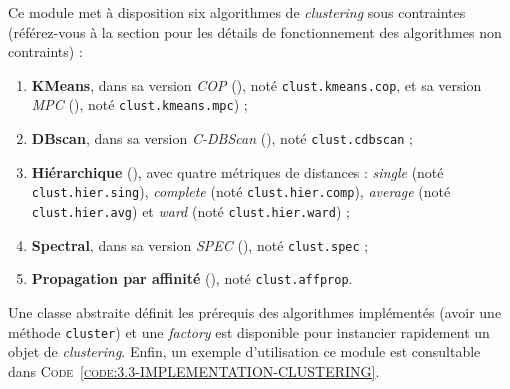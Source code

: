 		Ce module met à disposition six algorithmes de \textit{clustering} sous contraintes (référez-vous à la section  pour les détails de fonctionnement des algorithmes non contraints) :
		\begin{enumerate}
			\item \textbf{KMeans}, dans sa version \textit{COP} (\cite{wagstaff-etal:2001:constrained-kmeans-clustering}), noté \texttt{clust.kmeans.cop}, et sa version \textit{MPC} (\cite{khan-etal:2012:multiple-parameter-based}), noté \texttt{clust.kmeans.mpc}) ;
			\item \textbf{DBscan}, dans sa version \textit{C-DBScan} (\cite{ruiz-etal:2010:densitybased-semisupervised-clustering}), noté \texttt{clust.cdbscan} ;
			\item \textbf{Hiérarchique} (\cite{davidson-ravi:2005:agglomerative-hierarchical-clustering}), avec quatre métriques de distances : \textit{single} (noté \texttt{clust.hier.sing}), \textit{complete} (noté \texttt{clust.hier.comp}), \textit{average} (noté \texttt{clust.hier.avg}) et \textit{ward} (noté \texttt{clust.hier.ward}) ;
			\item \textbf{Spectral}, dans sa version \textit{SPEC} (\cite{kamvar-etal:2003:spectral-learning}), noté \texttt{clust.spec} ;
			\item \textbf{Propagation par affinité} (\cite{givoni-frey:2009:semisupervised-affinity-propagation}), noté \texttt{clust.affprop}.
		\end{enumerate}
		
		Une classe abstraite définit les prérequis des algorithmes implémentés (avoir une méthode \texttt{cluster}) et une \textit{factory} est disponible pour instancier rapidement un objet de \textit{clustering}.
		Enfin, un exemple d'utilisation ce module est consultable dans \textsc{Code~\ref{code:3.3-IMPLEMENTATION-CLUSTERING}}.
		
